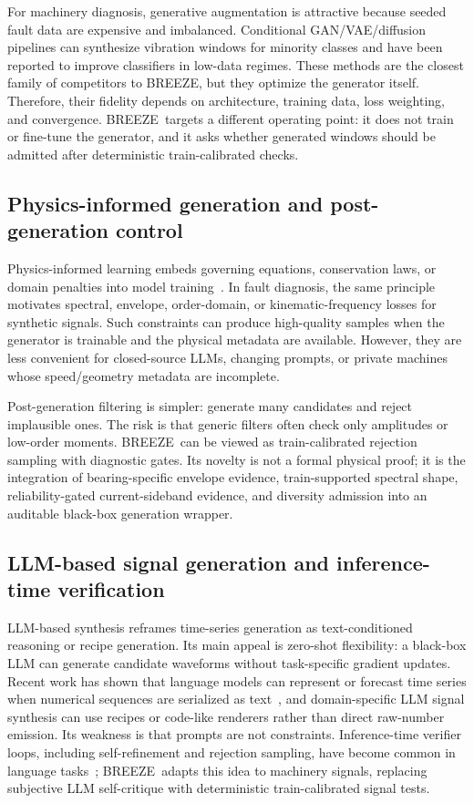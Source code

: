 \documentclass[review,3p,times]{elsarticle}
\newcommand{\breeze}{BREEZE}
\begin{document}
For machinery diagnosis, generative augmentation is attractive because seeded
fault data are expensive and imbalanced. Conditional GAN/VAE/diffusion
pipelines can synthesize vibration windows for minority classes and have been
reported to improve classifiers in low-data regimes. These methods are the
closest family of competitors to \breeze, but they optimize the generator
itself. Therefore, their fidelity depends on architecture, training data,
loss weighting, and convergence. \breeze\ targets a different operating point:
it does not train or fine-tune the generator, and it asks whether generated
windows should be admitted after deterministic train-calibrated checks.

\subsection{Physics-informed generation and post-generation control}

Physics-informed learning embeds governing equations, conservation laws, or
domain penalties into model training~\cite{raissi_pinn}. In fault diagnosis,
the same principle motivates spectral, envelope, order-domain, or
kinematic-frequency losses for synthetic signals. Such constraints can produce
high-quality samples when the generator is trainable and the physical metadata
are available. However, they are less convenient for closed-source LLMs,
changing prompts, or private machines whose speed/geometry metadata are
incomplete.

Post-generation filtering is simpler: generate many candidates and reject
implausible ones. The risk is that generic filters often check only amplitudes
or low-order moments. \breeze\ can be viewed as train-calibrated rejection
sampling with diagnostic gates. Its novelty is not a formal physical proof;
it is the integration of bearing-specific envelope evidence, train-supported
spectral shape, reliability-gated current-sideband evidence, and diversity
admission into an auditable black-box generation wrapper.

\subsection{LLM-based signal generation and inference-time verification}

LLM-based synthesis reframes time-series generation as text-conditioned
reasoning or recipe generation. Its main appeal is zero-shot flexibility: a
black-box LLM can generate candidate waveforms without task-specific gradient
updates. Recent work has shown that language models can represent or forecast
time series when numerical sequences are serialized as text~\cite{llmtime},
and domain-specific LLM signal synthesis can use recipes or code-like
renderers rather than direct raw-number emission. Its weakness is that prompts
are not constraints. Inference-time verifier loops, including self-refinement
and rejection sampling, have become common in language tasks~\cite{madaan};
\breeze\ adapts this idea to machinery signals, replacing subjective LLM
self-critique with deterministic train-calibrated signal tests.
\end{document}
